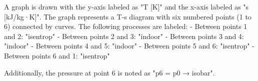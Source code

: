 A graph is drawn with the y-axis labeled as "T [K]" and the x-axis labeled as "s [kJ/kg·K]". The graph represents a T-s diagram with six numbered points (1 to 6) connected by curves. The following processes are labeled:  
- Between points 1 and 2: "isentrop"  
- Between points 2 and 3: "indoor"  
- Between points 3 and 4: "indoor"  
- Between points 4 and 5: "indoor"  
- Between points 5 and 6: "isentrop"  
- Between points 6 and 1: "isentrop"  

Additionally, the pressure at point 6 is noted as "p6 = p0 → isobar".
